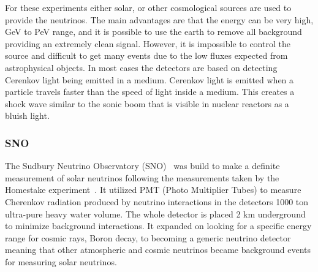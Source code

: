 For these experiments either solar, or other cosmological sources are used to provide the neutrinos. The main advantages are that the energy can be very high, GeV to PeV range, and it is possible to use the earth to remove all background providing an extremely clean signal. However, it is impossible to control the source and difficult to get many events due to the low fluxes expected from astrophysical objects. In most cases the detectors are based on detecting Cerenkov light being emitted in a medium. Cerenkov light is emitted when a particle travels faster than the speed of light inside a medium. This creates a shock wave similar to the sonic boom that is visible in nuclear reactors as a bluish light.

\subsubsection{SNO}
The Sudbury Neutrino Observatory (SNO)~\cite{Fix6} was build to make a definite measurement of solar neutrinos following the measurements taken by the Homestake experiment~\cite{9Davis}. It utilized PMT (Photo Multiplier Tubes) to measure Cherenkov radiation produced by neutrino interactions in the detectors 1000 ton ultra-pure heavy water volume. The whole detector is placed 2 km underground to minimize background interactions. It expanded on looking for a specific energy range for cosmic rays, Boron decay, to becoming a generic neutrino detector meaning that other atmospheric and cosmic neutrinos became background events for measuring solar neutrinos.

